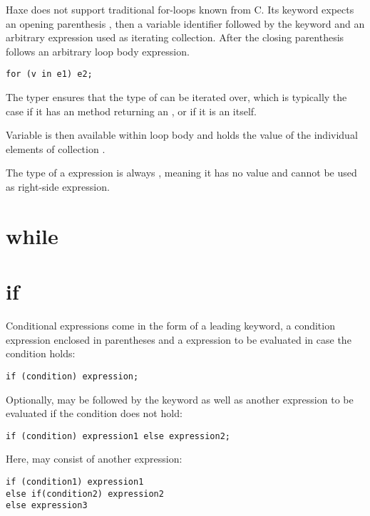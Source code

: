 \documentclass{haxe}
\begin{document}
Haxe does not support traditional for-loops known from C. Its  keyword expects an opening parenthesis \expr{(}, then a variable identifier followed by the keyword  and an arbitrary expression used as iterating collection. After the closing parenthesis \expr{)} follows an arbitrary loop body expression.

\begin{lstlisting}
for (v in e1) e2;
\end{lstlisting}

The typer ensures that the type of  can be iterated over, which is typically the case if it has an  method returning an , or if it is an  itself.

Variable  is then available within loop body  and holds the value of the individual elements of collection .

The type of a  expression is always , meaning it has no value and cannot be used as right-side expression.

\section{while}
\label{expression-while}

\section{if}
\label{expression-if}

Conditional expressions come in the form of a leading  keyword, a condition expression enclosed in parentheses \expr{()} and a expression to be evaluated in case the condition holds:

\begin{lstlisting}
if (condition) expression;
\end{lstlisting}

Optionally,  may be followed by the  keyword as well as another expression to be evaluated if the condition does not hold:

\begin{lstlisting}
if (condition) expression1 else expression2;
\end{lstlisting}

Here,  may consist of another  expression:

\begin{lstlisting}
if (condition1) expression1
else if(condition2) expression2
else expression3
\end{lstlisting}
\end{document}
